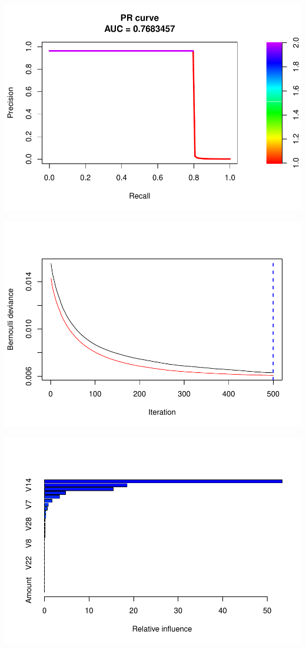 \documentclass[]{article}
\begin{document}
\begin{center}\includegraphics{Credit_Card_Fraud_Detection_Project_Report_files/figure-latex/unnamed-chunk-25-18} \end{center}

\begin{center}\includegraphics{Credit_Card_Fraud_Detection_Project_Report_files/figure-latex/unnamed-chunk-25-19} \end{center}

\begin{center}\includegraphics{Credit_Card_Fraud_Detection_Project_Report_files/figure-latex/unnamed-chunk-25-20} \end{center}
\end{document}
